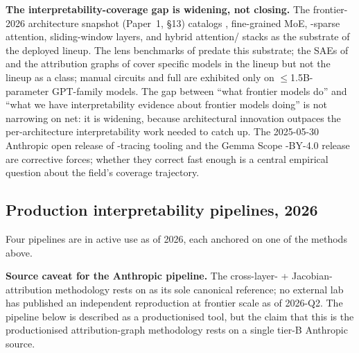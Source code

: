 \begin{contradiction}
\textbf{The interpretability-coverage gap is widening, not closing.}
The frontier-2026 architecture snapshot (Paper~1, §13) catalogs ,
fine-grained MoE, -sparse attention, sliding-window layers, and
hybrid attention/ stacks as the substrate of the deployed lineup.
The lens benchmarks of \citet{belrose2023-tuned-lens} predate this
substrate; the SAEs of \citet{gemma-scope-2024} and the attribution
graphs of \citet{lindsey2025-circuit-tracing} cover specific models in
the lineup but not the lineup as a class; manual circuits and full
 are exhibited only on $\le$1.5B-parameter
GPT-family models. The gap between ``what frontier models do'' and
``what we have interpretability evidence about frontier models doing''
is not narrowing on net: it is widening, because architectural
innovation outpaces the per-architecture interpretability work needed
to catch up. The 2025-05-30 Anthropic open release of -tracing
tooling and the Gemma Scope -BY-4.0 release are corrective forces;
whether they correct fast enough is a central empirical question about
the field's coverage trajectory.
\end{contradiction}

\subsection{Production interpretability pipelines, 2026}
\label{sec:scaling-pipelines}

Four pipelines are in active use as of 2026, each anchored on one of
the methods above.

\begin{forumsignal}
\textbf{Source caveat for the Anthropic pipeline.} The cross-layer-
+ Jacobian-attribution methodology rests on
\citet{lindsey2025-circuit-tracing} as its sole canonical reference;
no external lab has published an independent reproduction at frontier
scale as of 2026-Q2. The pipeline below is described as a productionised
tool, but the claim that this is the productionised
attribution-graph methodology rests on a single tier-B Anthropic source.
\end{forumsignal}

